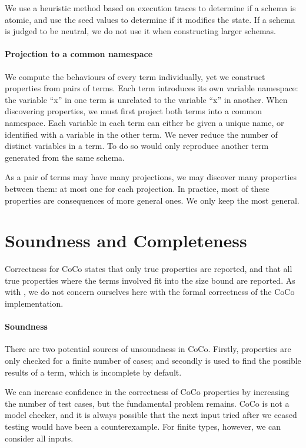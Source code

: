We use a heuristic method based on execution traces to determine if a
schema is atomic, and use the seed values to determine if it modifies
the state.  If a schema is judged to be neutral, we do not use it when
constructing larger schemas.

\paragraph{Projection to a common namespace}
We compute the behaviours of every term individually, yet we construct
properties from pairs of terms.  Each term introduces its own variable
namespace: the variable ``x'' in one term is unrelated to the variable
``x'' in another.  When discovering properties, we must first project
both terms into a common namespace.  Each variable in each term can
either be given a unique name, or identified with a variable in the
other term.  We never reduce the number of distinct variables in a
term.  To do so would only reproduce another term generated from the
same schema.

As a pair of terms may have many projections, we may discover many
properties between them: at most one for each projection.  In
practice, most of these properties are consequences of more general
ones.  We only keep the most general.

\section{Soundness and Completeness}
\label{sec:coco-correctness}

Correctness for CoCo states that only true properties are reported,
and that all true properties where the terms involved fit into the
size bound are reported.  As with \dejafu{}, we do not concern
ourselves here with the formal correctness of the CoCo implementation.

\paragraph{Soundness}
There are two potential sources of unsoundness in CoCo.  Firstly,
properties are only checked for a finite number of cases; and secondly
\dejafu{} is used to find the possible results of a term, which is
incomplete by default.

We can increase confidence in the correctness of CoCo properties by
increasing the number of test cases, but the fundamental problem
remains.  CoCo is not a model checker, and it is always possible that
the next input tried after we ceased testing would have been a
counterexample.  For finite types, however, we can consider all
inputs.

